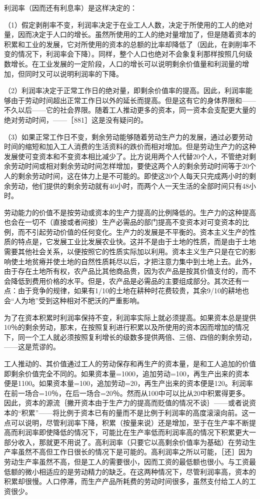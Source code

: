 利润率（因而还有利息率）是这样决定的：

（1）假定剥削率不变，利润率决定于在业工人人数，决定于所使用的工人的绝对量，因而决定于人口的增长。虽然所使用的工人的绝对量增加了，但是随着资本的积累和工业的发展，它对所使用的资本的总额的比率却降低了（因此，在剥削率不变的情况下，利润率会下降）。同样，整个人口也绝对不会象复利那样按照几何级数增长。在工业发展的一定阶段，人口的增长可以说明剩余价值量和利润量的增加，但同时又可以说明利润率的下降。

（2）利润率决定于正常工作日的绝对量，即剩余价值率的提高。因此，利润率能够由于劳动时间超出正常工作日以外的延长而提高。但是这有它的身体界限和——不久以后——它的社会界限。随着工人推动更多的资本，同一资本会支配更大量的绝对劳动时间，——［881］这是没有疑问的。

（3）如果正常工作日不变，剩余劳动能够随着劳动生产力的发展，通过必要劳动时间的缩短和加入工人消费的生活资料的跌价而相对增加。但是劳动生产力的这种发展使可变资本和不变资本相比减少了。比方说用两个人代替20个人，不管绝对剩余劳动时间或相对剩余劳动时间怎样增加，要使这两个人的剩余劳动时间等于20个人的剩余劳动时间，这在体力上是不可能的。即使这20个人每天只完成两小时的剩余劳动，他们提供的剩余劳动就有40小时，而两个人一天生活的全部时间只有48小时。

劳动能力的价值不是按劳动或资本的生产力提高的比例降低的。生产力的这种提高也会在一切不（直接或者间接）生产必需品的部门提高不变资本对可变资本的比例，而不引起劳动价值的任何变化。生产力的发展是不平衡的。资本主义生产的性质的特点是，它发展工业比发展农业快。这并不是由于土地的性质，而是由于土地需要其他社会关系，以便按照它的性质实际加以利用。资本主义生产只是在它的影响使土地贫瘠并使土地的自然性质耗尽以后，才把注意力集中到土地上去。此外，由于存在土地所有权，农产品比其他商品贵，因为农产品是按其价值支付的，而不会降低到费用价格的水平。但是，农产品是必需品的主要组成部分。其次还有一点：由于竞争的规律，如果有1/10的土地在耕种时花费较贵，其余9/10的耕地也会“人为地”受到这种相对不肥沃的严重影响。

为了在资本积累时利润率保持不变，利润率实际上就必须提高。如果资本总是提供10％的剩余劳动，那末，在按照复利进行积累以及所使用的资本因而增加的情况下，同一个工人就必须按照复利增长的级数多提供两倍、三倍、四倍的剩余劳动，——这是荒谬的。

工人推动的、其价值通过工人的劳动保存和再生产的资本量，是和工人追加的价值即剩余价值完全不同的。如果资本量=1000，追加劳动=100，再生产出来的资本便是1100。如果资本量=100，追加劳动=20，再生产出来的资本便是120。利润率在前一场合=10％，在后一场合=20％。然而从100中可以比从20中积累得更多。因此，资本的源流｛撇开资本由于生产力的提高而贬值的情况不谈｝——或者说资本的“积累”——将比例于资本已有的量而不是比例于利润率的高度滚滚向前。这一点可以说明，尽管利润率下降，积累（按量来说）还是增加，至于在生产率不断提高而利润率即使降低的情况下，可能比在生产率低而利润率高的情况下积累更大一部分收入，那就更不用说了。高利润率（只要它以高剩余价值率为基础）在劳动生产率虽然不高但工作日很长的情况下是可能的。高利润率之所以可能，［还］因为劳动生产率虽然不高，但是工人的需要很小，因而工资的最低额也很小。与工资最低额的微小相适应的是劳动精力的缺乏。在这两种情况下，尽管利润率高，资本的积累却很慢。人口停滞，而生产产品所耗费的劳动时间很多，虽然支付给工人的工资很少。

